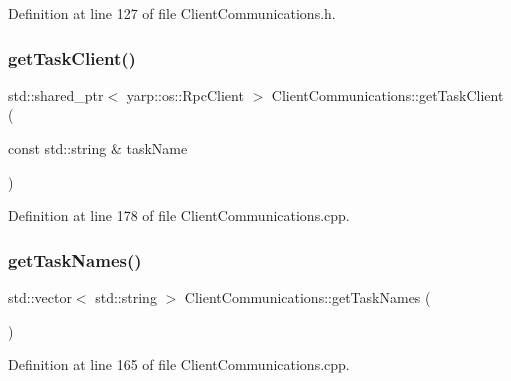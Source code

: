 Definition at line 127 of file Client\+Communications.\+h.

\hypertarget{classocra__recipes_1_1ClientCommunications_ad94eda2ba62336ea95b83622d0837543}{}\label{classocra__recipes_1_1ClientCommunications_ad94eda2ba62336ea95b83622d0837543} 
\subsubsection{\texorpdfstring{get\+Task\+Client()}{getTaskClient()}}
{\footnotesize\ttfamily std\+::shared\+\_\+ptr$<$ yarp\+::os\+::\+Rpc\+Client $>$ Client\+Communications\+::get\+Task\+Client (\begin{DoxyParamCaption}\item[{const std\+::string \&}]{task\+Name }\end{DoxyParamCaption})}



Definition at line 178 of file Client\+Communications.\+cpp.

\hypertarget{classocra__recipes_1_1ClientCommunications_a821a74e8c4b20e1d3da18e1cf6b7e31d}{}\label{classocra__recipes_1_1ClientCommunications_a821a74e8c4b20e1d3da18e1cf6b7e31d} 
\subsubsection{\texorpdfstring{get\+Task\+Names()}{getTaskNames()}}
{\footnotesize\ttfamily std\+::vector$<$ std\+::string $>$ Client\+Communications\+::get\+Task\+Names (\begin{DoxyParamCaption}{ }\end{DoxyParamCaption})}



Definition at line 165 of file Client\+Communications.\+cpp.

\hypertarget{classocra__recipes_1_1ClientCommunications_ab915047503c4cbddbd26c2036f8340ed}{}\label{classocra__recipes_1_1ClientCommunications_ab915047503c4cbddbd26c2036f8340ed} 
